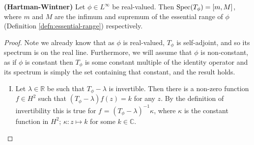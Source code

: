 \documentclass[../main.tex]{subfiles}
\begin{document}
\begin{theorem}{\textbf{(Hartman-Wintner)}}\label{thm:hartman-wintner}
Let $\phi \in L^\infty$ be real-valued. Then $\mathrm{Spec}(T_\phi) = [m, M]$, where $m$ and $M$ are the infimum and supremum of the essential range of $\phi$ (Definition \ref{defn:essential-range}) respectively.
\end{theorem}
\begin{proof}
Note we already know that as $\phi$ is real-valued, $T_\phi$ is self-adjoint, and so its spectrum is on the real line. 
Furthermore, we will assume that $\phi$ is non-constant, as if $\phi$ is constant then $T_\phi$ is some constant multiple of the identity operator
and its spectrum is simply the set containing that constant, and the result holds.
\begin{enumerate}[I.]
\item Let $\lambda \in \mathbb{R}$ be such that $T_\phi - \lambda$ is invertible. Then there is a non-zero function $f \in H^2$ such that $(T_\phi - \lambda)f(z) = k$ for any $z$. By the definition of invertibility this is true for $f$ = $(T_\phi - \lambda)^{-1}\kappa$, where
$\kappa$ is the constant function in $H^2$; $\kappa : z \mapsto k$ for some $k \in \mathbb{C}.$


\end{enumerate}
\end{proof}
\end{document}
